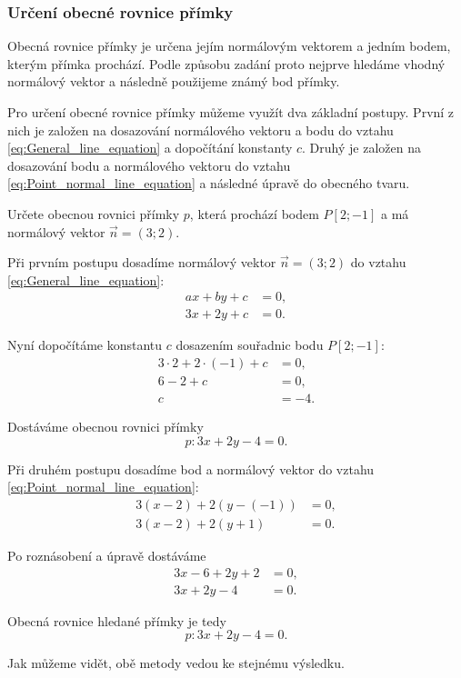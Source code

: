 \subsubsection{Určení obecné rovnice přímky}
\label{subsubsec:Determining_general_line_equation}

Obecná rovnice přímky je určena jejím normálovým vektorem a jedním
bodem, kterým přímka prochází. Podle způsobu zadání proto nejprve
hledáme vhodný normálový vektor a následně použijeme známý bod přímky.

Pro určení obecné rovnice přímky můžeme využít dva základní postupy.
První z nich je založen na dosazování normálového vektoru a bodu do vztahu
\eqref{eq:General_line_equation} a dopočítání konstanty $c$. 
Druhý je založen na dosazování bodu a normálového vektoru do vztahu \eqref{eq:Point_normal_line_equation} a následné úpravě do obecného tvaru.

\begin{example}\label{exa:General_line_from_point_normal}
    Určete obecnou rovnici přímky $p$, která prochází bodem $P[2;-1]$ a má normálový vektor $\vec{n}=(3;2)$.

    Při prvním postupu dosadíme normálový vektor $\vec{n}=(3;2)$ do vztahu
    \eqref{eq:General_line_equation}:
    \begin{align*}
        ax + by + c &= 0,\\
        3x + 2y + c &= 0.
    \end{align*}

    Nyní dopočítáme konstantu $c$ dosazením souřadnic bodu $P[2;-1]$:
    \begin{align*}
        3\cdot2 + 2\cdot(-1) + c &= 0,\\
        6 - 2 + c &= 0,\\
        c &= -4.
    \end{align*}

    Dostáváme obecnou rovnici přímky
    \[
        p: 3x + 2y - 4 = 0.
    \]


    Při druhém postupu dosadíme bod a normálový vektor do vztahu
    \eqref{eq:Point_normal_line_equation}:
    \begin{align*}
        3(x-2)+2(y-(-1))&=0,\\
        3(x-2)+2(y+1)&=0.
    \end{align*}

    Po roznásobení a úpravě dostáváme
    \begin{align*}
        3x-6+2y+2&=0,\\
        3x+2y-4&=0.
    \end{align*}

    Obecná rovnice hledané přímky je tedy
    \[
        p: 3x+2y-4=0.
    \]

    Jak můžeme vidět, obě metody vedou ke stejnému výsledku.
\end{example}

